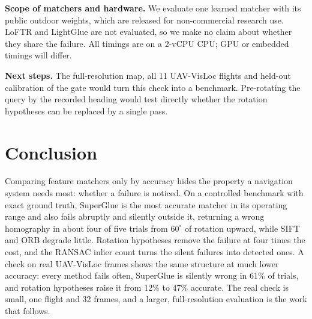 \documentclass[conference]{IEEEtran}
\begin{document}
\textbf{Scope of matchers and hardware.} We evaluate one learned matcher with its public outdoor weights, which are released for non-commercial research use. LoFTR \cite{sun2021loftr} and LightGlue \cite{lindenberger2023lightglue} are not evaluated, so we make no claim about whether they share the failure. All timings are on a 2-vCPU CPU; GPU or embedded timings will differ.

\textbf{Next steps.} The full-resolution map, all 11 UAV-VisLoc flights and held-out calibration of the gate would turn this check into a benchmark. Pre-rotating the query by the recorded heading would test directly whether the rotation hypotheses can be replaced by a single pass.

\section{Conclusion}

Comparing feature matchers only by accuracy hides the property a navigation system needs most: whether a failure is noticed. On a controlled benchmark with exact ground truth, SuperGlue is the most accurate matcher in its operating range and also fails abruptly and silently outside it, returning a wrong homography in about four of five trials from $60^\circ$ of rotation upward, while SIFT and ORB degrade little. Rotation hypotheses remove the failure at four times the cost, and the RANSAC inlier count turns the silent failures into detected ones. A check on real UAV-VisLoc frames shows the same structure at much lower accuracy: every method fails often, SuperGlue is silently wrong in 61\% of trials, and rotation hypotheses raise it from 12\% to 47\% accurate. The real check is small, one flight and 32 frames, and a larger, full-resolution evaluation is the work that follows.



\end{document}

